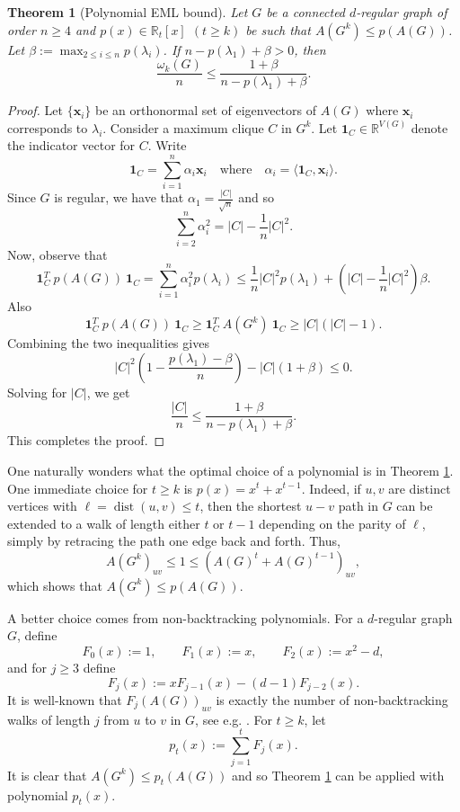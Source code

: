 \documentclass[11pt]{article}
\theoremstyle{plain}
\newtheorem{theorem}{Theorem}[section]
\numberwithin{equation}{section}
\DeclareMathOperator{\dist}{dist}
\begin{document}
\begin{theorem}[Polynomial EML bound]\label{thm:EML_approach}
Let $G$ be a connected $d$-regular graph of order $n\ge 4$ and $p(x)\in \mathbb{R}_t[x]$ $(t\ge k)$ be such that $A(G^k)\le p(A(G))$. Let $\beta:=\max_{2\le i\le n} p(\lambda_i)$. If $n - p(\lambda_1) +  \beta > 0$, then
\[
\frac{\omega_k(G)}{n} \le \frac{1 + \beta}{n - p(\lambda_1) + \beta}.
\]
\end{theorem}

\begin{proof}
Let $\{\mathbf{x}_i \}$ be an orthonormal set of eigenvectors of $A(G)$ where $\mathbf{x}_i$ corresponds to $\lambda_i$. Consider a maximum clique $C$ in $G^k$. Let $\mathbf{1}_C \in \mathbb{R}^{V(G)}$ denote the indicator vector for $C$. Write 
    \[
    \mathbf{1}_C = \sum_{i=1}^n \alpha_i \mathbf{x}_i \quad \text{where}\quad  \alpha_i = \langle \mathbf{1}_C, \mathbf{x}_i \rangle.
    \]
Since $G$ is regular, we have that $\alpha_1 = \frac{|C|}{\sqrt{n}}$ and so
    \[
    \sum_{i=2}^n\alpha_i^2 = |C| - \frac{1}{n}|C|^2.
    \]    
Now, observe that 
    \[
    \mathbf{1}_C^T\ p(A(G))\ \mathbf{1}_C = \sum_{i=1}^n \alpha_i^2 p(\lambda_i) \le \frac{1}{n}|C|^2p(\lambda_1) + \left(|C| - \frac{1}{n}|C|^2 \right)\beta.
    \]
Also
    \[
    \mathbf{1}_C^T \ p(A(G))\ \mathbf{1}_C \geq \mathbf{1}_C^T\ A(G^k)\ \mathbf{1}_C \ge |C|(|C|-1).
    \] 
Combining the two inequalities gives
\[ |C|^2\left(1 - \frac{p(\lambda_1) -  \beta}{n}\right) - |C|\left(1 + \beta \right)\le 0.\]
Solving for $|C|$, we get 
 \[ \frac{|C|}{n} \le \frac{1 + \beta}{n - p(\lambda_1) +  \beta}.\]
 This completes the proof.
\end{proof}

One naturally wonders what the optimal choice of a polynomial is in Theorem \ref{thm:EML_approach}. One immediate choice for $t\ge k$ is $p(x) = x^t + x^{t-1}$. Indeed, if $u,v$ are distinct vertices with $\ell=\dist(u,v)\le t$, then the shortest $u-v$ path in $G$ can be extended to a walk of length either $t$ or $t-1$ depending on the parity of $\ell$, simply by retracing the path one edge back and forth. Thus, \[A(G^k)_{uv}\le 1 \le  \left(A(G)^t + A(G)^{t-1}\right)_{uv},\]
which shows that $A(G^k)\le p(A(G))$. 

A better choice comes from non-backtracking polynomials. For a $d$-regular graph $G$, define 
\[ F_0(x) := 1, \qquad F_1(x):=x, \qquad F_2(x) := x^2-d, \]
and for $j\ge 3$ define 
\[ F_j(x) := xF_{j-1}(x)-(d-1)F_{j-2}(x).\]
It is well-known that $F_j(A(G))_{uv}$ is exactly the number of non-backtracking walks of length $j$ from $u$ to $v$ in $G$, see  e.g. \cite{Alon_Benjamini_Lubetzky_Sodin_2007}. For $t\ge k$, let
\begin{equation}\label{eq:non_backtracking}
   p_t(x):=\sum_{j=1}^t F_j(x). 
\end{equation}
It is clear that $A(G^k)\le p_t(A(G))$ and so Theorem \ref{thm:EML_approach} can be applied with polynomial $p_t(x)$. 
\end{document}
